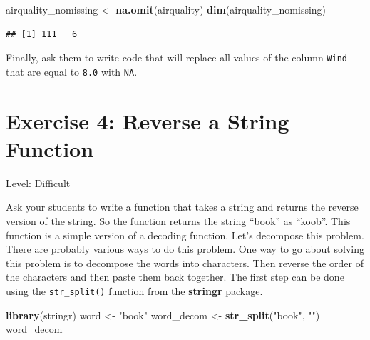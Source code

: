 \documentclass[]{book}
\newenvironment{Shaded}{\begin{snugshade}}{\end{snugshade}}
\newcommand{\FloatTok}[1]{\textcolor[rgb]{0.00,0.00,0.81}{#1}}
\newcommand{\KeywordTok}[1]{\textcolor[rgb]{0.13,0.29,0.53}{\textbf{#1}}}
\newcommand{\NormalTok}[1]{#1}
\newcommand{\OperatorTok}[1]{\textcolor[rgb]{0.81,0.36,0.00}{\textbf{#1}}}
\newcommand{\OtherTok}[1]{\textcolor[rgb]{0.56,0.35,0.01}{#1}}
\newcommand{\StringTok}[1]{\textcolor[rgb]{0.31,0.60,0.02}{#1}}
\begin{document}
\begin{Shaded}
\begin{Highlighting}[]
\NormalTok{airquality_nomissing <-}\StringTok{ }\KeywordTok{na.omit}\NormalTok{(airquality)}
\KeywordTok{dim}\NormalTok{(airquality_nomissing)}
\end{Highlighting}
\end{Shaded}

\begin{verbatim}
## [1] 111   6
\end{verbatim}

Finally, ask them to write code that will replace all values of the column \texttt{Wind} that are equal to \texttt{8.0} with \texttt{NA}.

\begin{Shaded}
\end{Shaded}

\hypertarget{exercise-4-reverse-a-string-function}{%
\section*{Exercise 4: Reverse a String Function}\label{exercise-4-reverse-a-string-function}}

Level: Difficult

Ask your students to write a function that takes a string and returns the reverse version of the string. So the function returns the string ``book'' as ``koob''. This function is a simple version of a decoding function. Let's decompose this problem. There are probably various ways to do this problem. One way to go about solving this problem is to decompose the words into characters. Then reverse the order of the characters and then paste them back together. The first step can be done using the \texttt{str\_split()} function from the \textbf{stringr} package.

\begin{Shaded}
\begin{Highlighting}[]
\KeywordTok{library}\NormalTok{(stringr)}
\NormalTok{word <-}\StringTok{ "book"}
\NormalTok{word_decom <-}\StringTok{ }\KeywordTok{str_split}\NormalTok{(}\StringTok{"book"}\NormalTok{, }\StringTok{""}\NormalTok{)}
\NormalTok{word_decom}
\end{Highlighting}
\end{Shaded}
\end{document}
